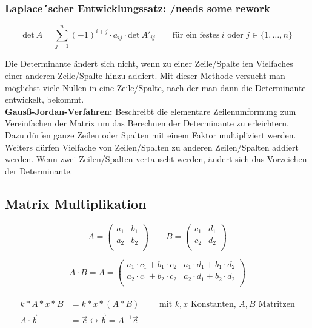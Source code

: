 \subsubsection{Laplace´scher Entwicklungssatz: /needs some rework}

\[
\text{det}\ A=\sum\limits_{j=1}^{n}(-1)^{i+j}\cdot a_{ij}\cdot \text{det}\ A'_{ij}\qquad \text{für ein festes}\ i\text{ oder } j \in \{1,\ldots,n \}
\]

Die Determinante ändert sich nicht, wenn zu einer Zeile/Spalte ien Vielfaches einer anderen Zeile/Spalte hinzu addiert. Mit dieser Methode versucht man möglichst viele Nullen in eine Zeile/Spalte, nach der man dann die Determinante entwickelt, bekommt.\\

\textbf{Gausß-Jordan-Verfahren:} Beschreibt die elementare Zeilenumformung zum Vereinfachen der Matrix um das Berechnen der Determinante zu erleichtern. Dazu dürfen ganze Zeilen oder Spalten mit einem Faktor multipliziert werden. Weiters dürfen Vielfache von Zeilen/Spalten zu anderen Zeilen/Spalten addiert werden. Wenn zwei Zeilen/Spalten vertauscht werden, ändert sich das Vorzeichen der Determinante.

\subsection{Matrix Multiplikation}

\[A=\begin{pmatrix}
 a_1 & b_1 \\
 a_2 & b_2 \\
\end{pmatrix} \qquad
B=\begin{pmatrix}
 c_1 & d_1 \\
 c_2 & d_2 \\
\end{pmatrix}\]

\[A\cdot B = 
A=\begin{pmatrix}
 a_1 \cdot c_1 + b_1 \cdot c_2 & a_1 \cdot d_1 + b_1 \cdot d_2 \\
 a_2 \cdot c_1 + b_2 \cdot c_2 & a_2 \cdot d_1 + b_2 \cdot d_2 \\
\end{pmatrix}\]\\

\begin{align}
    k*A*x*B &= k*x*(A*B) \qquad \text{ mit } k,x \text{ Konstanten, }A,B \text{ Matritzen}\\
    A\cdot \vec{b} &= \vec{c} \leftrightarrow \vec{b} = A^{-1}\vec{c}    
\end{align}


